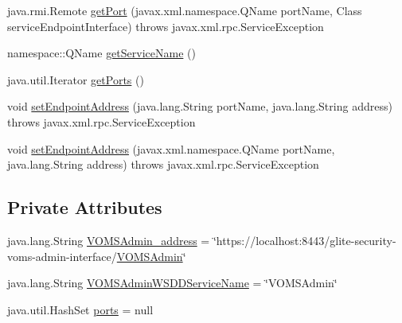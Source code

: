 \begin{DoxyCompactItemize}
\item 
java.rmi.Remote \hyperlink{classorg_1_1glite_1_1security_1_1voms_1_1service_1_1admin_1_1VOMSAdminServiceLocator_a3cf5b1535dfa2ca9ab9c602e24c02685}{getPort} (javax.xml.namespace.QName portName, Class serviceEndpointInterface)  throws javax.xml.rpc.ServiceException 
\item 
namespace::QName \hyperlink{classorg_1_1glite_1_1security_1_1voms_1_1service_1_1admin_1_1VOMSAdminServiceLocator_a0ef87cdf4ccc744554a022978483c35d}{getServiceName} ()
\item 
java.util.Iterator \hyperlink{classorg_1_1glite_1_1security_1_1voms_1_1service_1_1admin_1_1VOMSAdminServiceLocator_aec50359e551027dd4c86d0427a9cb5cc}{getPorts} ()
\item 
void \hyperlink{classorg_1_1glite_1_1security_1_1voms_1_1service_1_1admin_1_1VOMSAdminServiceLocator_a25bb96ac7e29defff54403a595ac17ee}{setEndpointAddress} (java.lang.String portName, java.lang.String address)  throws javax.xml.rpc.ServiceException 
\item 
void \hyperlink{classorg_1_1glite_1_1security_1_1voms_1_1service_1_1admin_1_1VOMSAdminServiceLocator_a926dbce6cd1b65637bedb6dac11214a7}{setEndpointAddress} (javax.xml.namespace.QName portName, java.lang.String address)  throws javax.xml.rpc.ServiceException 
\end{DoxyCompactItemize}
\subsection*{Private Attributes}
\begin{DoxyCompactItemize}
\item 
java.lang.String \hyperlink{classorg_1_1glite_1_1security_1_1voms_1_1service_1_1admin_1_1VOMSAdminServiceLocator_a65424a457a064c5405aad0ca1304503e}{VOMSAdmin\_\-address} = \char`\"{}https://localhost:8443/glite-\/security-\/voms-\/admin-\/interface/\hyperlink{interfaceorg_1_1glite_1_1security_1_1voms_1_1service_1_1admin_1_1VOMSAdmin}{VOMSAdmin}\char`\"{}
\item 
java.lang.String \hyperlink{classorg_1_1glite_1_1security_1_1voms_1_1service_1_1admin_1_1VOMSAdminServiceLocator_a00b09a56a70c27e1f729adfec6f6b9d1}{VOMSAdminWSDDServiceName} = \char`\"{}VOMSAdmin\char`\"{}
\item 
java.util.HashSet \hyperlink{classorg_1_1glite_1_1security_1_1voms_1_1service_1_1admin_1_1VOMSAdminServiceLocator_a5d5510e2ba038ca0dd8dafe5bc7fd330}{ports} = null
\end{DoxyCompactItemize}



